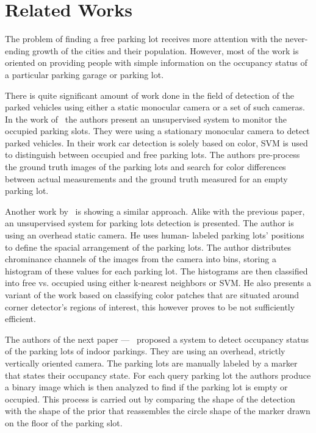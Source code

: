 \chapter{Related Works}\label{cha:related_works}

The problem of finding a free parking lot receives more attention with the
never-ending growth of the cities and their population. However, most of the
work is oriented on providing people with simple information on the occupancy
status of a particular parking garage or parking lot.

There is quite significant amount of work done in the field of detection of
the parked vehicles using either a static monocular camera or a set of such
cameras. In the work of~\cite{qizhang06} the authors present an unsupervised
system to monitor the occupied parking slots. They were using a stationary
monocular camera to detect parked vehicles. In their work car detection is
solely based on color, SVM is used to distinguish between occupied and free
parking lots. The authors pre-process the ground truth images of the parking
lots and search for color differences between actual measurements and the
ground truth measured for an empty parking lot.

Another work by~\cite{nicolastrue} is showing a similar approach. Alike with
the previous paper, an unsupervised system for parking lots detection is
presented. The author is using an overhead static camera. He uses human-
labeled parking lots' positions to define the spacial arrangement of the
parking lots. The author distributes chrominance channels of the images from
the camera into bins, storing a histogram of these values for each parking
lot. The histograms are then classified into free vs. occupied using either
k-nearest neighbors or SVM. He also presents a variant of the work based on
classifying color patches that are situated around corner detector's regions
of interest, this however proves to be not sufficiently efficient.

The authors of the next paper ---~\cite{yusnita12} proposed a system to detect
occupancy status of the parking lots of indoor parkings. They are using an
overhead, strictly vertically oriented camera. The parking lots are manually
labeled by a marker that states their occupancy state. For each query parking
lot the authors produce a binary image which is then analyzed to find if the
parking lot is empty or occupied. This process is carried out by comparing the
shape of the detection with the shape of the prior that reassembles the circle
shape of the marker drawn on the floor of the parking slot.


